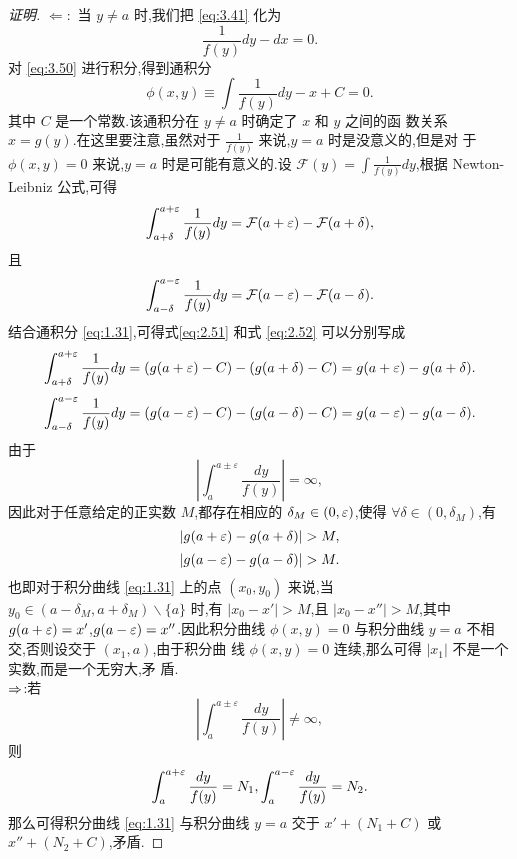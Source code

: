 \documentclass[a4paper, 12pt]{article} %
\begin{document}
\begin{proof}[证明]
$\Leftarrow:$  当 $y\neq a$ 时,我们把 \eqref{eq:3.41} 化为
  \begin{equation}
    \label{eq:3.50}
    \frac{1}{f(y)}dy-dx=0.
  \end{equation}
  对 \eqref{eq:3.50} 进行积分,得到通积分
  \begin{equation}\label{eq:1.31}
\phi(x,y)\equiv\int \frac{1}{f(y)}dy-x+C=0.
  \end{equation}
其中 $C$ 是一个常数.该通积分在 $y\neq a$ 时确定了 $x$ 和 $y$ 之间的函
数关系 $x=g(y)$.在这里要注意,虽然对于 $\frac{1}{f(y)}$ 来说,$y=a$ 时是没意义的,但是对
于 $\phi(x,y)=0$ 来说,$y=a$ 时是可能有意义的.设 $\mathcal{F}(y)=\int \frac{1}{f(y)}dy$,根据 Newton-Leibniz 公式,可得
\begin{equation}
  \label{eq:2.51}
  \int_{a+\delta}^{a+\varepsilon}\frac{1}{f(y)}dy=\mathcal{F}(a+\varepsilon)-\mathcal{F}(a+\delta),
\end{equation}
且
\begin{equation}
  \label{eq:2.52}
  \int_{a-\delta}^{a-\varepsilon}\frac{1}{f(y)}dy=\mathcal{F}(a-\varepsilon)-\mathcal{F}(a-\delta).
\end{equation}
结合通积分 \eqref{eq:1.31},可得式\eqref{eq:2.51} 和式 \eqref{eq:2.52} 可以分别写成
\begin{equation}
  \label{eq:3.35}
  \int_{a+\delta}^{a+\varepsilon}\frac{1}{f(y)}dy=(g(a+\varepsilon)-C)-(g(a+\delta)-C)=g(a+\varepsilon)-g(a+\delta).
\end{equation}
\begin{equation}
  \label{eq:3.38}
  \int_{a-\delta}^{a-\varepsilon}\frac{1}{f(y)}dy=(g(a-\varepsilon)-C)-(g(a-\delta)-C)=g(a-\varepsilon)-g(a-\delta).
\end{equation}
由于
$$
|\int_a^{a\pm \varepsilon}\frac{dy}{f(y)}|=\infty,
$$
因此对于任意给定的正实数 $M$,都存在相应的 $\delta_M\in (0,\varepsilon)$,使得
$\forall \delta\in (0,\delta_M)$,有
\begin{equation}
  \label{eq:3.49}
  |g(a+\va)-g(a+\delta)|>M,
\end{equation}
\begin{equation}
  \label{eq:3.50}
  |g(a-\va)-g(a-\delta)|>M.
\end{equation}
也即对于积分曲线 \eqref{eq:1.31} 上的点 $(x_0,y_0)$ 来说,当 $y_0\in
(a-\delta_{M},a+\delta_{M})\backslash\{a\}$ 时,有 $|x_0-x'|>M$,且 $|x_0-x''|>M$,其中 $g(a+\varepsilon)=x'$,$g(a-\varepsilon)=x''$.因此积分曲线
$\phi(x,y)=0$ 与积分曲线 $y=a$ 不相交,否则设交于 $(x_1,a)$,由于积分曲
线 $\phi(x,y)=0$ 连续,那么可得 $|x_1|$ 不是一个实数,而是一个无穷大,矛
盾.\\


\ni$\Rightarrow$:若$$
|\int_a^{a\pm \varepsilon}\frac{dy}{f(y)}|\neq\infty,
$$
则$$
\int_a^{a+\varepsilon}\frac{dy}{f(y)}=N_{1},\int_a^{a-\varepsilon}\frac{dy}{f(y)}=N_2.
$$
那么可得积分曲线 \eqref{eq:1.31} 与积分曲线 $y=a$ 交于 $x'+(N_1+C)$ 或
$x''+(N_2+C)$,矛盾.
\end{proof}
\end{document}
